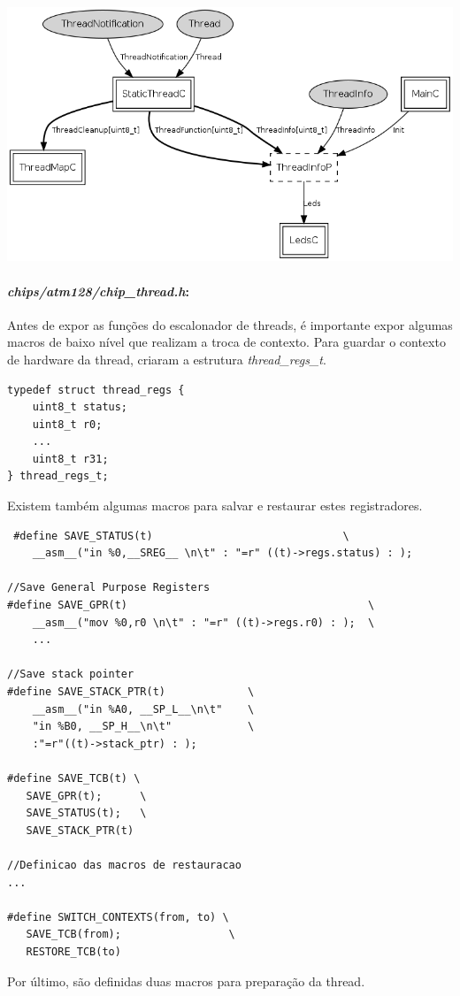 \documentclass[a4paper, 10pt]{article}
\begin{document}
\includegraphics[scale=0.5]{tos-lib-tosthreads-system-ThreadC.png}

\paragraph{\textit{chips/atm128/chip\_thread.h}:}
Antes de expor as funções do escalonador de threads, é importante expor algumas macros de baixo nível que realizam a
troca de contexto. Para guardar o contexto de hardware da thread, criaram a estrutura \textit{thread\_regs\_t}.
\begin{lstlisting}
typedef struct thread_regs {
    uint8_t status;
    uint8_t r0;
    ...
    uint8_t r31;
} thread_regs_t;
\end{lstlisting}
Existem também algumas macros para salvar e restaurar estes registradores.
\begin{lstlisting}
 #define SAVE_STATUS(t)                              \
    __asm__("in %0,__SREG__ \n\t" : "=r" ((t)->regs.status) : );

//Save General Purpose Registers
#define SAVE_GPR(t)                                      \
    __asm__("mov %0,r0 \n\t" : "=r" ((t)->regs.r0) : );  \
    ...

//Save stack pointer
#define SAVE_STACK_PTR(t)             \
    __asm__("in %A0, __SP_L__\n\t"    \
    "in %B0, __SP_H__\n\t"            \
    :"=r"((t)->stack_ptr) : );

#define SAVE_TCB(t) \
   SAVE_GPR(t);      \
   SAVE_STATUS(t);   \
   SAVE_STACK_PTR(t) 

//Definicao das macros de restauracao
...

#define SWITCH_CONTEXTS(from, to) \
   SAVE_TCB(from);                 \
   RESTORE_TCB(to)
\end{lstlisting}
Por último, são definidas duas macros para preparação da thread.
\end{document}
